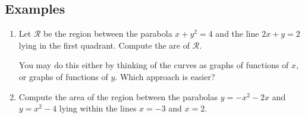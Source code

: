 \documentclass[11pt]{article}
\theoremstyle{definition}
\theoremstyle{named}
\numberwithin{myalgctr}{section}
\begin{document}
\subsection*{Examples}
\begin{enumerate}
  \item Let $\mathcal{R}$ be the region between the parabola $x+y^2=4$ and the line $2x+y=2$ lying in the first quadrant. Compute the are of $\mathcal{R}$.

  You may do this either by thinking of the curves as graphs of functions of $x$, or graphs of functions of $y$. Which approach is easier?
  \item Compute the area of the region between the parabolas $y=-x^2-2x$ and $y=x^2-4$ lying within the lines $x=-3$ and $x=2$. 
\end{enumerate}
\end{document}
